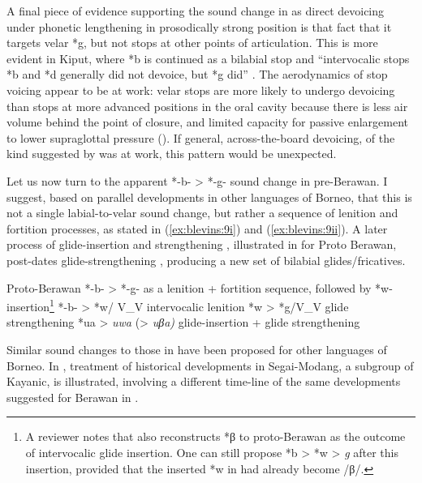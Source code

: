\documentclass[output=paper]{langscibook}
\begin{document}
A final piece of evidence supporting the sound change in  as direct devoicing under phonetic lengthening in prosodically strong position is that fact that it targets velar *g, but not stops at other points of articulation. This is more evident in Kiput, where *b is continued as a bilabial stop and “intervocalic stops *b and *d generally did not devoice, but *g did” \citep[668]{Blust2013}. The aerodynamics of stop voicing appear to be at work: velar stops are more likely to undergo devoicing than stops at more advanced positions in the oral cavity because there is less air volume behind the point of closure, and limited capacity for passive enlargement to lower supraglottal pressure (\citealt{OhalaRiordan1980}). If general, across-the-board devoicing, of the kind suggested by \citet{Beguš2019} was at work, this pattern would be unexpected.

Let us now turn to the apparent *-b- > *-g- sound change in pre-Berawan. I suggest, based on parallel developments in other languages of Borneo, that this is not a single labial-to-velar sound change, but rather a sequence of lenition and fortition processes, as stated in (\ref{ex:blevins:9i}) and (\ref{ex:blevins:9ii}). A later process of glide-insertion and strengthening , illustrated in  for Proto Berawan, post-dates glide-strengthening , producing a new set of bilabial glides/fricatives.

\ea%
\label{ex:blevins:9}Proto-Berawan *-b- > *-g- as a lenition + fortition sequence, followed by *w-insertion\footnote{A reviewer notes that \citet{Burkhardt2014} also reconstructs *β to proto-Berawan as the outcome of intervocalic glide insertion. One can still propose *b > *w > \textit{g} after this insertion, provided that the inserted *w in  had already become /β/.}
\ea\label{ex:blevins:9i} *-b- > *w/ V\_V     \tab intervocalic lenition
\ex\label{ex:blevins:9ii} *w > *g/V\_V       \tab glide strengthening
\ex\label{ex:blevins:9iii} *ua > \textit{uwa} (> \textit{uβa)} \tab glide-insertion + glide strengthening
\z
\z

Similar sound changes to those in  have been proposed for other languages of Borneo. In ,  treatment of historical developments in Segai-Modang, a subgroup of Kayanic, is illustrated, involving a different time-line of the same developments suggested for Berawan in .
\end{document}
